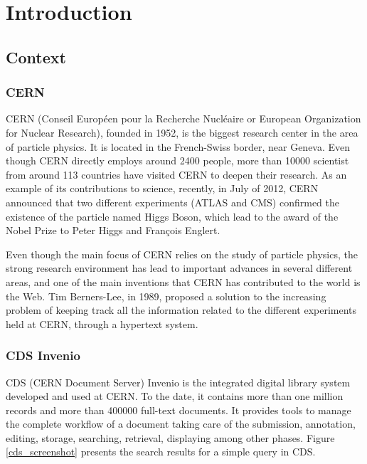 \chapter{Introduction}


\section{Context}

\subsection{CERN}
CERN (Conseil Europ\'{e}en pour la Recherche Nucl\'{e}aire or European Organization for Nuclear Research)\cite{CERN}, founded in 1952, is the biggest research center in the area of particle physics. It is located in the French-Swiss border, near Geneva. Even though CERN directly employs around 2400 people, more than 10000 scientist from around 113 countries have visited CERN to deepen their research. As an example of its contributions to science, recently, in July of 2012, CERN announced that two different experiments (ATLAS and CMS) confirmed the existence of the particle named Higgs Boson, which lead to the award of the Nobel Prize to Peter Higgs and Fran\c{c}ois Englert.

Even though the main focus of CERN relies on the study of particle physics, the strong research environment has lead to important advances in several different areas, and one of the main inventions that CERN has contributed to the world is the Web. Tim Berners-Lee, in 1989, proposed a solution\cite{web_proposal} to the increasing problem of keeping track all the information related to the different experiments held at CERN, through a hypertext system. 

\subsection{CDS Invenio}
CDS\cite{CDS1} (CERN Document Server) Invenio is the integrated digital library system developed and used at CERN\cite{CDS2}. To the date, it contains more than one million records and more than 400000 full-text documents. It provides tools to manage the complete workflow of a document taking care of the submission, annotation, editing, storage, searching, retrieval, displaying among other phases. Figure \ref{cds_screenshot} presents the search results for a simple query in CDS.

